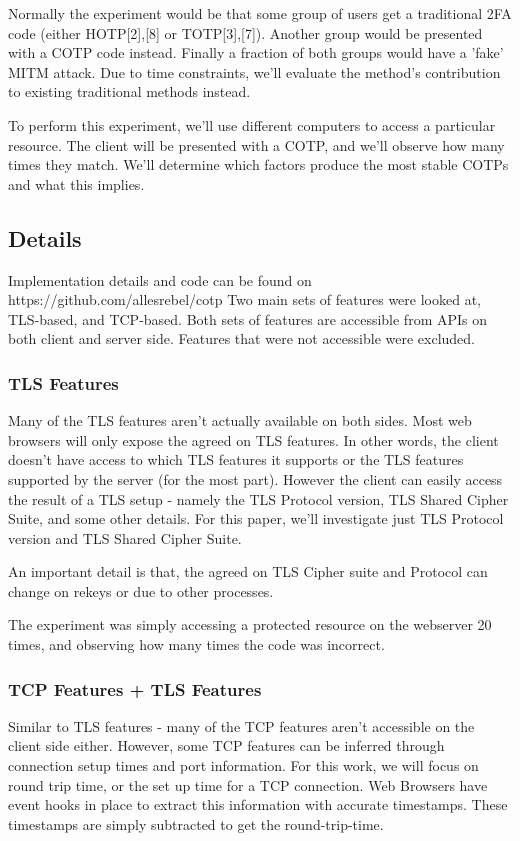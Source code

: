\documentclass[a4paper, 11pt]{article} 				%
\begin{document}
Normally the experiment would be that some group of users get a traditional 2FA code (either HOTP[2],[8] or TOTP[3],[7]). Another group would be presented with a COTP code instead. Finally a fraction of both groups would have a 'fake' MITM attack. Due to time constraints, we'll evaluate the method's contribution to existing traditional methods instead.

To perform this experiment, we'll use different computers to access a particular resource. The client will be presented with a COTP, and we'll observe how many times they match. We'll determine which factors produce the most stable COTPs and what this implies.

\subsection{Details}
Implementation details and code can be found on https://github.com/allesrebel/cotp
Two main sets of features were looked at, TLS-based, and TCP-based. Both sets of features are accessible from APIs on both client and server side. Features that were not accessible were excluded. 

\subsubsection{TLS Features}
Many of the TLS features aren't actually available on both sides. Most web browsers will only expose the agreed on TLS features. In other words, the client doesn't have access to which TLS features it supports or the TLS features supported by the server (for the most part). However the client can easily access the result of a TLS setup - namely the TLS Protocol version, TLS Shared Cipher Suite, and some other details. For this paper, we'll investigate just TLS Protocol version and TLS Shared Cipher Suite. 

An important detail is that, the agreed on TLS Cipher suite and Protocol can change on rekeys or due to other processes. 

The experiment was simply accessing a protected resource on the webserver 20 times, and observing how many times the code was incorrect.

\subsubsection{TCP Features + TLS Features}
Similar to TLS features - many of the TCP features aren't accessible on the client side either. However, some TCP features can be inferred through connection setup times and port information. For this work, we will focus on round trip time, or the set up time for a TCP connection. Web Browsers have event hooks in place to extract this information with accurate timestamps. These timestamps are simply subtracted to get the round-trip-time. 
\end{document}
